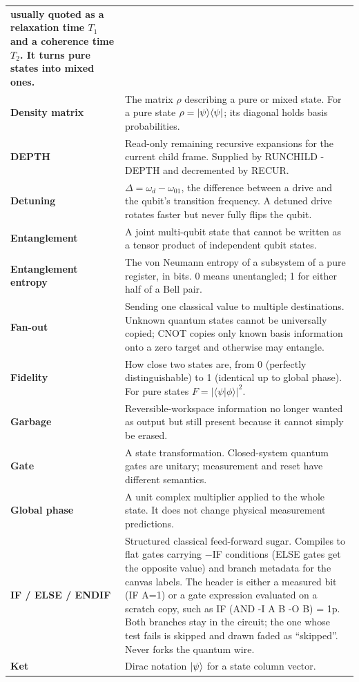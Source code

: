 \begin{longtable}{>{\bfseries}p{}p{}}
usually quoted as a relaxation time $T_1$ and a coherence time $T_2$. It turns
pure states into mixed ones.\\
Density matrix & The matrix $\rho$ describing a pure or mixed state. For a
pure state $\rho=\lvert \psi\rangle\langle \psi\rvert$; its diagonal holds basis probabilities.\\
DEPTH & Read-only remaining recursive expansions for the current child frame.
Supplied by RUNCHILD -DEPTH and decremented by RECUR.\\
Detuning & $\Delta=\omega_d-\omega_{01}$, the difference between a drive
and the qubit's transition frequency. A detuned drive rotates faster but
never fully flips the qubit.\\
Entanglement & A joint multi-qubit state that cannot be written as a tensor
product of independent qubit states.\\
Entanglement entropy & The von Neumann entropy of a subsystem of a pure
register, in bits. 0 means unentangled; 1 for either half of a Bell pair.\\
Fan-out & Sending one classical value to multiple destinations. Unknown quantum
states cannot be universally copied; CNOT copies only known basis information
onto a zero target and otherwise may entangle.\\
Fidelity & How close two states are, from 0 (perfectly distinguishable) to 1
(identical up to global phase). For pure states $F=|\langle\psi|\phi\rangle|^2$.\\
Garbage & Reversible-workspace information no longer wanted as output but still
present because it cannot simply be erased.\\
Gate & A state transformation. Closed-system quantum gates are unitary;
measurement and reset have different semantics.\\
Global phase & A unit complex multiplier applied to the whole state. It does
not change physical measurement predictions.\\
IF / ELSE / ENDIF & Structured classical feed-forward sugar. Compiles to flat
gates carrying $-$IF conditions (ELSE gates get the opposite value) and branch
metadata for the canvas labels. The header is either a measured bit
(IF A=1) or a gate expression evaluated on a scratch copy, such as
IF (AND -I A B -O B) = 1p. Both branches stay in the circuit; the one whose
test fails is skipped and drawn faded as ``skipped''. Never forks the quantum
wire.\\
Ket & Dirac notation $\lvert \psi\rangle$ for a state column vector.\\

\end{longtable}
